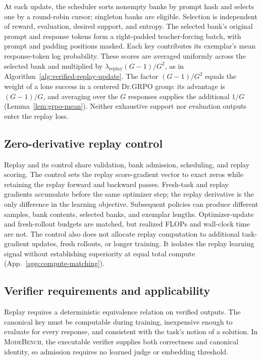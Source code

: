 \documentclass{article}
\newcommand{\1}{\mathbf 1}
\newcommand{\mb}{\textsc{ModeBench}}
\theoremstyle{remark}
\theoremstyle{definition}
\theoremstyle{plain}
\begin{document}
At each update, the scheduler sorts nonempty banks by prompt hash and selects
one by a round-robin cursor; singleton banks are eligible. Selection is
independent of reward, evaluation, desired support, and entropy. The selected
bank's original prompt and response tokens form a right-padded
teacher-forcing batch, with prompt and padding positions masked. Each key
contributes its exemplar's mean response-token log probability. These scores
are averaged uniformly across the selected bank and multiplied by
$\lambda_{\mathrm{replay}}(G-1)/G^2$, as in
Algorithm~\ref{alg:verified-replay-update}. The factor $(G-1)/G^2$ equals the
weight of a lone success in a centered Dr.GRPO group: its advantage is
$(G-1)/G$, and averaging over the $G$ responses supplies the additional
$1/G$ (Lemma~\ref{lem:grpo-mean}). Neither exhaustive support nor evaluation
outputs enter the replay loss.

\subsection{Zero-derivative replay control}
\label{app:algorithm-control}

Replay and its control share validation, bank admission, scheduling, and
replay scoring. The control sets the replay score-gradient vector to exact
zeros while retaining the replay forward and backward passes. Fresh-task
and replay gradients accumulate before the same optimizer step; the
replay derivative is the only difference in the learning objective.
Subsequent policies can produce different samples, bank contents, selected
banks, and exemplar lengths. Optimizer-update and fresh-rollout budgets are
matched, but realized FLOPs and wall-clock time are not. The control also
does not allocate replay computation to additional task-gradient updates,
fresh rollouts, or longer training. It isolates the replay learning signal
without establishing superiority at equal total compute
(App.~\ref{app:compute-matching}).

\subsection{Verifier requirements and applicability}
\label{app:algorithm-identity}

Replay requires a deterministic equivalence relation on verified outputs.
The canonical key must be computable during training, inexpensive enough to
evaluate for every response, and consistent with the task's notion of a
solution. In \mb{}, the executable verifier supplies both correctness and
canonical identity, so admission requires no learned judge or embedding
threshold.
\end{document}
